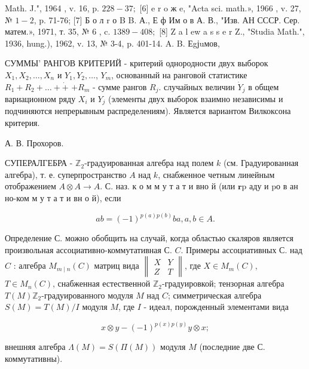 \documentclass[10pt]{article}
\begin{document}
Math. J.", 1964 , v. 16, p. $228-37 ;$ [6] e r o ж e, "Acta sci. math.», 1966 , v. 27, № $1-2$, p. 71-76; [7] Б о л r о B B. А., Е ф Им о в А. В., "Изв. АН СССР. Сер. матем.», 1971, т. 35, № 6 , c. $1389-408 ;$ [8] Z a l ew a s s e r Z., "Studia Math.", 1936, hung.), 1962, v. 13, № 3-4, p. 401-14. A. B. Еgјuмов,



СУММЫ' РАНГОВ КРИТЕРИЙ - критерий однородности двух выборок $X_{1}, X_{2}, \ldots, X_{n}$ и $Y_{1}, Y_{2}, \ldots$, $Y_{m}$, основанный на ранговой статистике $R_{1}+R_{2}+\ldots+\dot{+}$ $+R_{m}$ - сумме рангов $R_{j}$. случайных величин $\dot{Y}_{j}$ в общем вариационном ряду $X_{i}$ и $Y_{j}$ (элементы двух выборок взаимно независимы и подчиняются непрерывным распределениям). Является вариантом Вилкоксона критерия.



А. В. Прохоров.



СУПЕРАЛГЕБРА - $\mathbb{Z}_{2}$-градуированная алгебра над полем $k$ (см. Градуированная алгебра), т. е. суперпространство $A$ над $k$, снабженное четным линейным отображением $A \otimes A \rightarrow A$. С. наз. к о м м у т а т и вно й (или $\mathbf{r} \mathrm{p}$ аду и $\mathrm{p} о$ в ан но-ком м у т а т и вн о й), если



\[

a b=(-1)^{p(a) p(b)} b a, a, b \in A .

\]



Определение С. можно обобщить на случай, когда областью скаляров является произвольная ассоциативно-коммутативная С. $C$. Примеры ассоциативных С. над $C$ : алгебра $M_{m \mid n}(C)$ матриц вида $\left\|\begin{array}{ll}X & Y \\ Z & T\end{array}\right\|$, где $X \in M_{m}(C)$, $T \in M_{n}(C)$, снабженная естественной $\mathbb{Z}_{2}$-градуировкой; тензорная алгебра $T(M) \mathbb{Z}_{2}$-градуированного модуля $M$ над $C$; симметрическая алгебра $S(M)=T(M) / I$ модуля $M$, где $I$ - идеал, порожденный элементами вида



\[

x \otimes y-(-1)^{p(x) p(y)} y \otimes x ;

\]



внешняя алгебра $\Lambda(M)=S(\Pi(M))$ модуля $M$ (последние две С. коммутативны).
\end{document}
